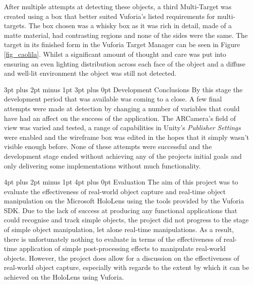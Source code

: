 \documentclass[12pt,a4paper,oneside]{article}
\makeatletter
\renewcommand\subsubsection{\@startsection {subsubsection}{1}{0mm} %
	                           {3pt plus 2pt minus 1pt} %
	                           {3pt plus 0pt} %
	                           {\normalfont\bfseries}}
\renewcommand\section{\@startsection {section}{1}{0mm} %
                               {4pt plus 2pt minus 1pt} %
                               {4pt plus 0pt} %
                               {\Large\bfseries}}
\makeatother
\begin{document}
After multiple attempts at detecting these objects, a third Multi-Target was created using a box that better suited Vuforia's listed requirements for multi-targets. The box chosen was a whisky box as it was rich in detail, made of a matte material, had contrasting regions and none of the sides were the same. The target in its finished form in the Vuforia Target Manager can be seen in Figure \ref{fig_caolila}. Whilst a significant amount of thought and care was put into ensuring an even lighting distribution across each face of the object and a diffuse and well-lit environment the object was still not detected.

\subsubsection{Development Conclusions}
By this stage the development period that was available was coming to a close. A few final attempts were made at detection by changing a number of variables that could have had an affect on the success of the application. The ARCamera's field of view was varied and tested, a range of capabilities in Unity's \textit{Publisher Settings} were enabled and the wireframe box was edited in the hopes that it simply wasn't visible enough before. None of these attempts were successful and the development stage ended without achieving any of the projects initial goals and only delivering some implementations without much functionality.

\newpage
\section{Evaluation}
The aim of this project was to evaluate the effectiveness of real-world object capture and real-time object manipulation on the Microsoft HoloLens using the tools provided by the Vuforia SDK. Due to the lack of success at producing any functional applications that could recognise and track simple objects, the project did not progress to the stage of simple object manipulation, let alone real-time manipulations. As a result, there is unfortunately nothing to evaluate in terms of the effectiveness of real-time application of simple post-processing effects to manipulate real-world objects. However, the project does allow for a discussion on the effectiveness of real-world object capture, especially with regards to the extent by which it can be achieved on the HoloLens using Vuforia.
\end{document}
